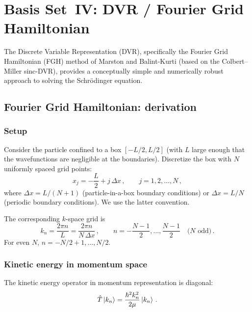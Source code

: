 \section{Basis Set~IV: DVR / Fourier Grid Hamiltonian}\label{sec:DVR}

The Discrete Variable Representation (DVR), specifically the Fourier Grid Hamiltonian (FGH)
method of Marston and Balint-Kurti (based on the Colbert--Miller sinc-DVR), provides a
conceptually simple and numerically robust approach to solving the Schr\"odinger equation.

\subsection{Fourier Grid Hamiltonian: derivation}\label{sec:FGH}

\subsubsection{Setup}

Consider the particle confined to a box $[-L/2, L/2]$ (with $L$ large enough that the
wavefunctions are negligible at the boundaries). Discretize the box with $N$ uniformly
spaced grid points:
\begin{equation}
  x_j = -\frac{L}{2} + j\,\Delta x\,,\qquad j = 1, 2, \ldots, N\,,
\end{equation}
where $\Delta x = L/(N+1)$ (particle-in-a-box boundary conditions) or $\Delta x = L/N$
(periodic boundary conditions). We use the latter convention.

The corresponding $k$-space grid is
\begin{equation}
  k_n = \frac{2\pi n}{L} = \frac{2\pi n}{N\,\Delta x}\,,\qquad
  n = -\frac{N-1}{2}, \ldots, \frac{N-1}{2}\quad\text{($N$ odd)}\,.
\end{equation}
For even $N$, $n = -N/2+1, \ldots, N/2$.

\subsubsection{Kinetic energy in momentum space}

The kinetic energy operator in momentum representation is diagonal:
\begin{equation}
  \hat{T}\ket{k_n} = \frac{\hbar^2 k_n^2}{2\mu}\ket{k_n}\,.
\end{equation}

